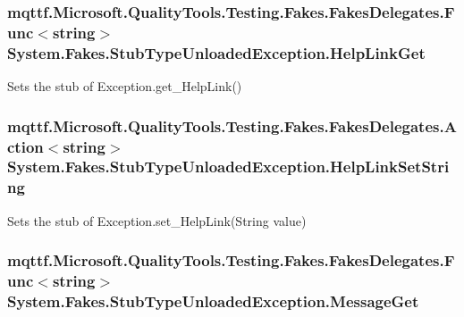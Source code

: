\hypertarget{class_system_1_1_fakes_1_1_stub_type_unloaded_exception_af29dbdf2e9780786174ddbaa115ce040}{
\subsubsection[{Help\-Link\-Get}]{\setlength{\rightskip}{0pt plus 5cm}mqttf.\-Microsoft.\-Quality\-Tools.\-Testing.\-Fakes.\-Fakes\-Delegates.\-Func$<$string$>$ System.\-Fakes.\-Stub\-Type\-Unloaded\-Exception.\-Help\-Link\-Get}}\label{class_system_1_1_fakes_1_1_stub_type_unloaded_exception_af29dbdf2e9780786174ddbaa115ce040}


Sets the stub of Exception.\-get\-\_\-\-Help\-Link()

\hypertarget{class_system_1_1_fakes_1_1_stub_type_unloaded_exception_aaba33e63345b5c772d83c59342306a09}{
\subsubsection[{Help\-Link\-Set\-String}]{\setlength{\rightskip}{0pt plus 5cm}mqttf.\-Microsoft.\-Quality\-Tools.\-Testing.\-Fakes.\-Fakes\-Delegates.\-Action$<$string$>$ System.\-Fakes.\-Stub\-Type\-Unloaded\-Exception.\-Help\-Link\-Set\-String}}\label{class_system_1_1_fakes_1_1_stub_type_unloaded_exception_aaba33e63345b5c772d83c59342306a09}


Sets the stub of Exception.\-set\-\_\-\-Help\-Link(\-String value)

\hypertarget{class_system_1_1_fakes_1_1_stub_type_unloaded_exception_a0dc90ac83f2084104f80b291c6fb63ef}{
\subsubsection[{Message\-Get}]{\setlength{\rightskip}{0pt plus 5cm}mqttf.\-Microsoft.\-Quality\-Tools.\-Testing.\-Fakes.\-Fakes\-Delegates.\-Func$<$string$>$ System.\-Fakes.\-Stub\-Type\-Unloaded\-Exception.\-Message\-Get}}\label{class_system_1_1_fakes_1_1_stub_type_unloaded_exception_a0dc90ac83f2084104f80b291c6fb63ef}


